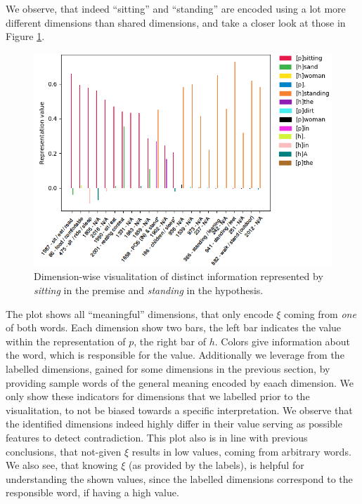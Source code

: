 We observe, that indeed ``sitting'' and ``standing'' are encoded using a lot more different dimensions than shared dimensions, and take a closer look at those in Figure \ref{fig:contradiction_alignment_unshared_dimwise}. 
\begin{figure}[tph!]
\centering
	\includegraphics[totalheight=7cm]{fig/contradiction_alignment_unshared_dimwise.png}
	\caption{Dimension-wise visualitation of distinct information represented by \textit{sitting} in the premise and \textit{standing} in the hypothesis.}
	\label{fig:contradiction_alignment_unshared_dimwise}
\end{figure}
The plot shows all ``meaningful'' dimensions, that only encode $\xi$ coming from \textit{one} of both words. Each dimension show two bars, the left bar indicates the value within the representation of $p$, the right bar of $h$. Colors give information about the word, which is responsible for the value. Additionally we leverage from the labelled dimensions, gained for some dimensions in the previous section, by providing sample words of the general meaning encoded by eaach dimension. We only show these indicators for dimensions that we labelled prior to the visualitation, to not be biased towards a specific interpretation. We observe that the identified dimensions indeed highly differ in their value serving as possible features to detect contradiction. This plot also is in line with previous conclusions, that not-given $\xi$ results in low values, coming from arbitrary words. We also see, that knowing $\xi$ (as provided by the labels), is helpful for understanding the shown values, since the labelled dimensions correspond to the responsible word, if having a high value.
